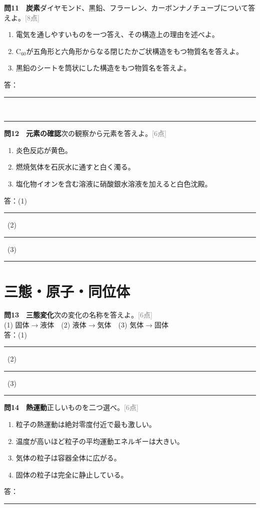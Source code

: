 \documentclass[11pt,a4paper]{ctexart}
\newcommand{\blank}[1]{\rule{#1}{0.4pt}}
\newcommand{\score}[1]{\hfill\textcolor{gray}{[#1点]}}
\newenvironment{qbox}{\begin{list}{}{\setlength{\leftmargin}{0pt}}\item\begin{minipage}{\linewidth}}{\end{minipage}\end{list}\vspace{3mm}}
\begin{document}
\begin{qbox}\textbf{問11　炭素}\quad ダイヤモンド、黒鉛、フラーレン、カーボンナノチューブについて答えよ。\score{8}
\begin{enumerate}[label=(\arabic*),leftmargin=9mm]\item 電気を通しやすいものを一つ答え、その構造上の理由を述べよ。\item C$_{60}$が五角形と六角形からなる閉じたかご状構造をもつ物質名を答えよ。\item 黒鉛のシートを筒状にした構造をもつ物質名を答えよ。\end{enumerate}
答：\blank{150mm}\\[3mm]\blank{150mm}\end{qbox}

\begin{qbox}\textbf{問12　元素の確認}\quad 次の観察から元素を答えよ。\score{6}
\begin{enumerate}[label=(\arabic*),leftmargin=9mm]\item 炎色反応が黄色。\item 燃焼気体を石灰水に通すと白く濁る。\item 塩化物イオンを含む溶液に硝酸銀水溶液を加えると白色沈殿。\end{enumerate}
答：(1)\blank{25mm}\ (2)\blank{25mm}\ (3)\blank{25mm}\end{qbox}

\section{三態・原子・同位体}
\begin{qbox}\textbf{問13　三態変化}\quad 次の変化の名称を答えよ。\score{6}\\
(1) 固体$\to$液体　(2) 液体$\to$気体　(3) 気体$\to$固体\\[2mm]
答：(1)\blank{25mm}\ (2)\blank{25mm}\ (3)\blank{25mm}\end{qbox}

\begin{qbox}\textbf{問14　熱運動}\quad 正しいものを二つ選べ。\score{6}
\begin{enumerate}[label=\Alph*.,leftmargin=9mm]\item 粒子の熱運動は絶対零度付近で最も激しい。\item 温度が高いほど粒子の平均運動エネルギーは大きい。\item 気体の粒子は容器全体に広がる。\item 固体の粒子は完全に静止している。\end{enumerate}
答：\blank{35mm}\end{qbox}
\end{document}
